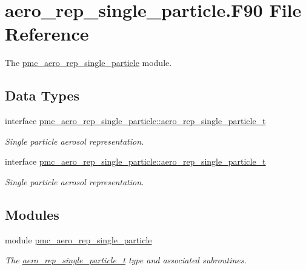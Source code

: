 \hypertarget{aero__rep__single__particle_8_f90}{}\section{aero\+\_\+rep\+\_\+single\+\_\+particle.\+F90 File Reference}
\label{aero__rep__single__particle_8_f90}


The \mbox{\hyperlink{namespacepmc__aero__rep__single__particle}{pmc\+\_\+aero\+\_\+rep\+\_\+single\+\_\+particle}} module.  


\subsection*{Data Types}
\begin{DoxyCompactItemize}
\item 
interface \mbox{\hyperlink{structpmc__aero__rep__single__particle_1_1aero__rep__single__particle__t}{pmc\+\_\+aero\+\_\+rep\+\_\+single\+\_\+particle\+::aero\+\_\+rep\+\_\+single\+\_\+particle\+\_\+t}}
\begin{DoxyCompactList}\small\item\em Single particle aerosol representation. \end{DoxyCompactList}\item 
interface \mbox{\hyperlink{structpmc__aero__rep__single__particle_1_1aero__rep__single__particle__t}{pmc\+\_\+aero\+\_\+rep\+\_\+single\+\_\+particle\+::aero\+\_\+rep\+\_\+single\+\_\+particle\+\_\+t}}
\begin{DoxyCompactList}\small\item\em Single particle aerosol representation. \end{DoxyCompactList}\end{DoxyCompactItemize}
\subsection*{Modules}
\begin{DoxyCompactItemize}
\item 
module \mbox{\hyperlink{namespacepmc__aero__rep__single__particle}{pmc\+\_\+aero\+\_\+rep\+\_\+single\+\_\+particle}}
\begin{DoxyCompactList}\small\item\em The \mbox{\hyperlink{structpmc__aero__rep__single__particle_1_1aero__rep__single__particle__t}{aero\+\_\+rep\+\_\+single\+\_\+particle\+\_\+t}} type and associated subroutines. \end{DoxyCompactList}\end{DoxyCompactItemize}
